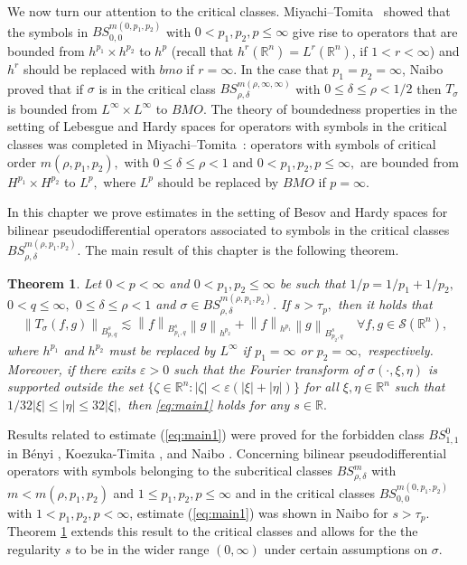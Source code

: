 \documentclass[final,letterpaper,12pt,oneside]{class_diss}
\newtheorem{theorem}{Theorem}[section]
\theoremstyle{remark}
\newcommand{\re}{\mathbb{R}}
\newcommand{\rn}{{{\mathbb R}^n}}
\newcommand{\sw}{{\mathcal{S}}(\rn)}
\newcommand{\ibes}[3]{B_{#1,#3}^{#2}} %
\newcommand{\abs}[1]{\left\vert #1 \right\vert}
\newcommand{\norm}[2]{\left\|#1\right\|_{#2}}
\newcommand{\hcline}{1/p=1/p_1+1/p_2}
\begin{document}
We now turn our attention to the critical classes. Miyachi--Tomita~\cite{MR3179688} showed that the symbols in $BS^{m(0,p_1,p_2)}_{0,0}$ with $0<p_1,p_2,p\le  \infty $ give rise to operators that are bounded from  $h^{p_1}\times h^{p_2}$ to $h^p$ (recall that $h^{r}(\rn)=L^r(\rn)$, if $1<r<\infty$)  and $h^{r}$ should be replaced with $bmo$ if $r=\infty.$   In the case that $p_1 = p_2 = \infty$, Naibo~\cite{MR3411149}  proved  that if $\sigma$ is in the critical class $BS^{m(\rho, \infty,\infty)}_{\rho,\delta}$ with $0\le \delta\le \rho<1/2 $ then $T_\sigma$ is bounded from $L^{\infty}\times L^{\infty}$ to $BMO.$ The theory of boundedness properties in the setting of Lebesgue and  Hardy  spaces for operators with symbols in the critical classes was completed in Miyachi--Tomita~\cite{MT1, MT2}: operators with symbols of critical order $ m(\rho, p_1,p_2),$ with $0\le \delta\le \rho<1$  and $0< p_1,p_2,p\le \infty,$ are bounded from $H^{p_1}\times H^{p_2}$ to $L^p,$ where  $L^p$ should be replaced by $BMO$ if $p=\infty.$

In this chapter we prove estimates in the setting of Besov and Hardy spaces for bilinear pseudodifferential operators associated to symbols in the critical classes $BS^{m(\rho,p_1,p_2)}_{\rho,\delta}$. The main result of this chapter is the following theorem.

\begin{theorem} \label{thm:main1}
Let $0<p<\infty$ and  $0<p_1,p_2\le \infty$ be such that $\hcline,$ $0<q\le \infty,$   $0\le\delta\le \rho<1$ and   $\sigma\in BS^{m(\rho,p_1,p_2)}_{\rho,\delta}.$ If $s>\tau_p,$ then it holds that
\begin{equation}\label{eq:main1}
\norm{T_\sigma(f,g)}{\ibes{p}{s}{q}}\lesssim \norm{f}{\ibes{p_1}{s}{q}}\norm{g}{h^{p_2}} +\norm{f}{h^{p_1}}\norm{g}{\ibes{p_2}{s}{q}}\quad \forall f,g\in \sw,
\end{equation}
where $h^{p_1}$ and $h^{p_2}$ must be replaced by $L^\infty$ if $p_1=\infty$ or $p_2=\infty,$ respectively. Moreover,  if there exits $\varepsilon>0$ such that the Fourier transform of  $\sigma(\cdot,\xi,\eta)$ is  supported outside the set  $\{\zeta\in\rn:\abs{\zeta}<\varepsilon (\abs{\xi}+\abs{\eta})\}$ for all  $\xi,\eta\in\rn$ such that $1/32\abs{\xi}\le \abs{\eta}\le 32 \abs{\xi},$ then \eqref{eq:main1} holds for any $s\in\re.$
\end{theorem}

Results related to estimate (\ref{eq:main1}) were proved for the forbidden class $BS^0_{1,1}$ in B\'enyi \cite{MR1996120}, Koezuka-Timita \cite{MR3750316}, and Naibo \citep{MR3393696}. Concerning bilinear pseudodifferential operators with symbols belonging to the subcritical classes $BS^m_{\rho,\delta}$ with $m<m(\rho,p_1,p_2)$ and $1\leq p_1,p_2,p \leq \infty$ and in the critical classes $BS^{m(0,p_1,p_2)}_{0,0}$ with $1<p_1,p_2,p<\infty$, estimate (\ref{eq:main1}) was shown in Naibo \citep[Theorem 1.3]{MR3393696} for $s>\tau_p$. Theorem \ref{thm:main1} extends this result to the critical classes and allows for the the regularity $s$ to be in the wider range $(0,\infty)$ under certain assumptions on $\sigma$. 
\end{document}
